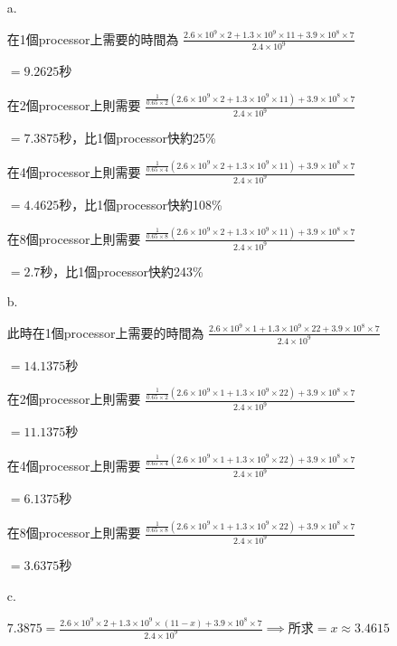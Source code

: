\documentclass{article}
\begin{document}
\begin{enumerate}
    \item[a.]

        在1個processor上需要的時間為
        \(\displaystyle
        \frac
        {2.6 \times 10^9 \times 2 + 1.3 \times 10^9 \times 11 + 3.9 \times 10^8 \times 7}
        {2.4 \times 10^9}
        \)

        \(= 9.2625\)秒

        在2個processor上則需要
        \(\displaystyle
        \frac
        {\frac{1}{0.65 \times 2}(2.6 \times 10^9 \times 2 + 1.3 \times 10^9 \times 11) + 3.9 \times 10^8 \times 7}
        {2.4 \times 10^9}
        \)

        \(= 7.3875\)秒，比1個processor快約25\%

        在4個processor上則需要
        \(\displaystyle
        \frac
        {\frac{1}{0.65 \times 4}(2.6 \times 10^9 \times 2 + 1.3 \times 10^9 \times 11) + 3.9 \times 10^8 \times 7}
        {2.4 \times 10^9}
        \)

        \(= 4.4625\)秒，比1個processor快約108\%

        在8個processor上則需要
        \(\displaystyle
        \frac
        {\frac{1}{0.65 \times 8}(2.6 \times 10^9 \times 2 + 1.3 \times 10^9 \times 11) + 3.9 \times 10^8 \times 7}
        {2.4 \times 10^9}
        \)

        \(= 2.7\)秒，比1個processor快約243\%

        \item[b.]

        此時在1個processor上需要的時間為
        \(\displaystyle
        \frac
        {2.6 \times 10^9 \times 1 + 1.3 \times 10^9 \times 22 + 3.9 \times 10^8 \times 7}
        {2.4 \times 10^9}
        \)

        \(= 14.1375\)秒

        在2個processor上則需要
        \(\displaystyle
        \frac
        {\frac{1}{0.65 \times 2}(2.6 \times 10^9 \times 1 + 1.3 \times 10^9 \times 22) + 3.9 \times 10^8 \times 7}
        {2.4 \times 10^9}
        \)

        \(= 11.1375\)秒

        在4個processor上則需要
        \(\displaystyle
        \frac
        {\frac{1}{0.65 \times 4}(2.6 \times 10^9 \times 1 + 1.3 \times 10^9 \times 22) + 3.9 \times 10^8 \times 7}
        {2.4 \times 10^9}
        \)

        \(= 6.1375\)秒

        在8個processor上則需要
        \(\displaystyle
        \frac
        {\frac{1}{0.65 \times 8}(2.6 \times 10^9 \times 1 + 1.3 \times 10^9 \times 22) + 3.9 \times 10^8 \times 7}
        {2.4 \times 10^9}
        \)

        \(= 3.6375\)秒
    \item[c.]

        \(\displaystyle
        7.3875 = \frac
        {2.6 \times 10^9 \times 2 + 1.3 \times 10^9 \times (11 - x) + 3.9 \times 10^8 \times 7}
        {2.4 \times 10^9}
        \implies\)所求\(= x \approx 3.4615\)
\end{enumerate}
\end{document}
